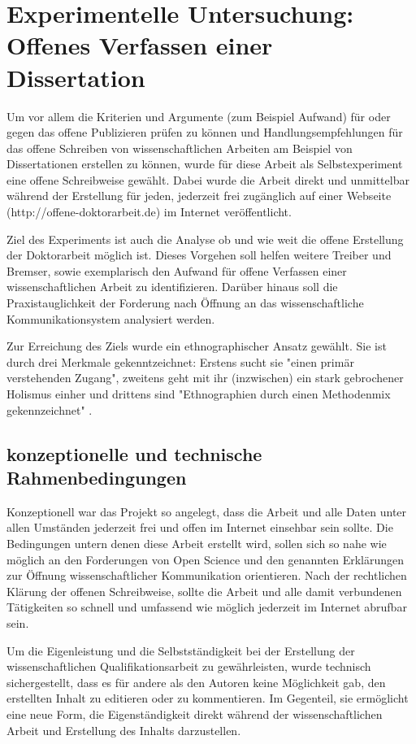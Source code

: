 \chapter{Experimentelle Untersuchung: Offenes Verfassen einer Dissertation}

Um vor allem die Kriterien und Argumente (zum Beispiel Aufwand) für oder gegen das offene Publizieren prüfen zu können und Handlungsempfehlungen für das offene Schreiben von wissenschaftlichen Arbeiten am Beispiel von Dissertationen erstellen zu können, wurde für diese Arbeit als Selbstexperiment eine offene Schreibweise gewählt. Dabei wurde die Arbeit direkt und unmittelbar während der Erstellung für jeden, jederzeit frei zugänglich auf einer Webseite (http://offene-doktorarbeit.de) im Internet veröffentlicht.

Ziel des Experiments ist auch die Analyse ob und wie weit die offene Erstellung der Doktorarbeit möglich ist. Dieses Vorgehen soll helfen weitere Treiber und Bremser, sowie exemplarisch den Aufwand für offene Verfassen einer wissenschaftlichen Arbeit zu identifizieren. Darüber hinaus soll die Praxistauglichkeit der Forderung nach Öffnung an das wissenschaftliche Kommunikationsystem analysiert werden.

Zur Erreichung des Ziels wurde ein ethnographischer Ansatz gewählt. Sie ist durch drei Merkmale gekenntzeichnet: Erstens sucht sie  "einen primär verstehenden Zugang", zweitens geht mit ihr (inzwischen) ein stark gebrochener Holismus einher und drittens sind "Ethnographien durch einen Methodenmix gekennzeichnet" \cite{bachmann_2011_ethnographie}.

\section{konzeptionelle und technische Rahmenbedingungen}

Konzeptionell war das Projekt so angelegt, dass die Arbeit und alle Daten unter allen Umständen jederzeit frei und offen im Internet einsehbar sein sollte. Die Bedingungen untern denen diese Arbeit erstellt wird, sollen sich so nahe wie möglich an den Forderungen von Open Science und den genannten Erklärungen zur Öffnung wissenschaftlicher Kommunikation orientieren. Nach der rechtlichen Klärung der offenen Schreibweise, sollte die Arbeit und alle damit verbundenen Tätigkeiten so schnell und umfassend wie möglich jederzeit im Internet abrufbar sein.

Um die Eigenleistung und die Selbstständigkeit bei der Erstellung der wissenschaftlichen Qualifikationsarbeit zu gewährleisten, wurde technisch sichergestellt, dass es für andere als den Autoren keine Möglichkeit gab, den erstellten Inhalt zu editieren oder zu kommentieren. Im Gegenteil, sie ermöglicht eine neue Form, die Eigenständigkeit direkt während der wissenschaftlichen Arbeit und Erstellung des Inhalts darzustellen.

